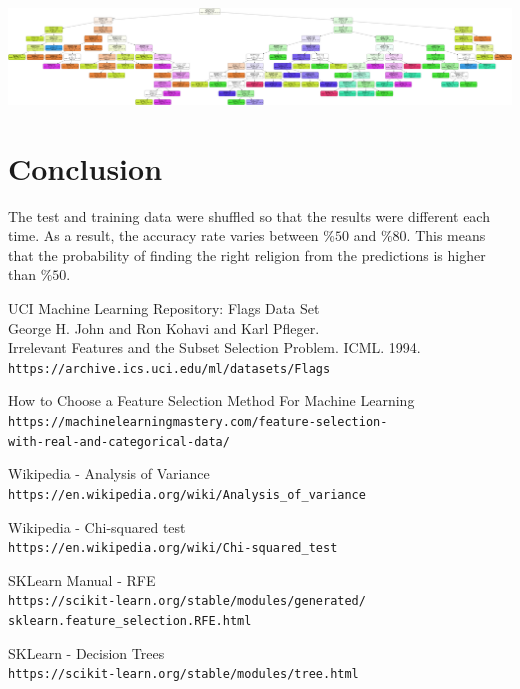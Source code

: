 \documentclass[conference]{IEEEtran}
\begin{document}
\includegraphics[scale=0.03]{rfe_decision_tree.png}


\section{Conclusion}

The test and training data were shuffled so that the results were different each time. As a result, the accuracy rate varies between $\%50$ and $\%80$. This means that the probability of finding the right religion from the predictions is higher than $\%50$.

\begin{thebibliography}{9}



UCI Machine Learning Repository: Flags Data Set\\
George H. John and Ron Kohavi and Karl Pfleger.\\
Irrelevant Features and the Subset Selection Problem. ICML. 1994.
\\\texttt{https://archive.ics.uci.edu/ml/datasets/Flags}


How to Choose a Feature Selection Method For Machine Learning
\\\texttt{https://machinelearningmastery.com/feature-selection-\\with-real-and-categorical-data/}

Wikipedia - Analysis of Variance
\\\texttt{https://en.wikipedia.org/wiki/Analysis\_of\_variance}

Wikipedia - Chi-squared test
\\\texttt{https://en.wikipedia.org/wiki/Chi-squared\_test}

SKLearn Manual - RFE
\\\texttt{https://scikit-learn.org/stable/modules/generated/\\sklearn.feature\_selection.RFE.html}

SKLearn - Decision Trees
\\\texttt{https://scikit-learn.org/stable/modules/tree.html}



\end{thebibliography}

\vspace{12pt}
\end{document}
